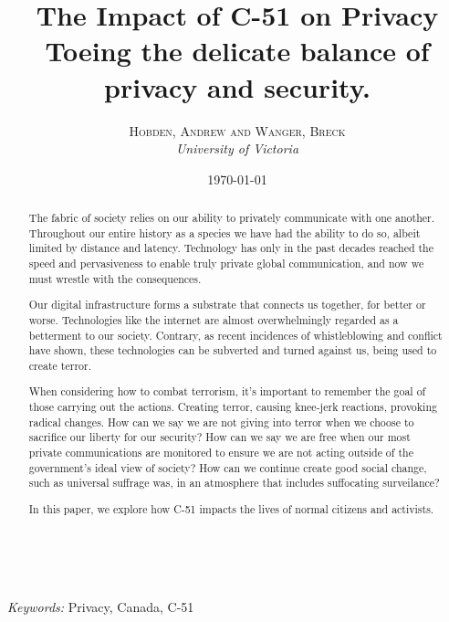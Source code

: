 \documentclass[a4paper, 11pt]{article} %
\title{
    \textbf{The Impact of C-51 on Privacy}\\ %
    Toeing the delicate balance of privacy and security.
} %
\author{\textsc{Hobden, Andrew and Wanger, Breck} %
\\{\textit{University of Victoria}}} %
\date{\today} %
\makeatletter
\renewcommand{\maketitle}{ %
\begin{flushright} %
{\LARGE\@title} %

\vspace{50pt} %

{\large\@author} %
\\\@date %

\vspace{40pt} %
\end{flushright}
}
\makeatother
\begin{document}
\maketitle %



\begin{abstract}
The fabric of society relies on our ability to privately communicate with one another. Throughout our entire history as a species we have had the ability to do so, albeit limited by distance and latency. Technology has only in the past decades reached the speed and pervasiveness to enable truly private global communication, and now we must wrestle with the consequences.

Our digital infrastructure forms a substrate that connects us together, for better or worse. Technologies like the internet are almost overwhelmingly regarded as a betterment to our society. Contrary, as recent incidences of whistleblowing and conflict have shown, these technologies can be subverted and turned against us, being used to create terror.

When considering how to combat terrorism, it's important to remember the goal of those carrying out the actions. Creating terror, causing knee-jerk reactions, provoking radical changes. How can we say we are not giving into terror when we choose to sacrifice our liberty for our security? How can we say we are free when our most private communications are monitored to ensure we are not acting outside of the government's ideal view of society? How can we continue create good social change, such as universal suffrage was, in an atmosphere that includes suffocating surveilance?

In this paper, we explore how C-51 impacts the lives of normal citizens and activists.
\end{abstract}

\hspace*{3,6mm}\textit{Keywords:} Privacy, Canada, C-51 %

\vspace{30pt} %

\end{document}
